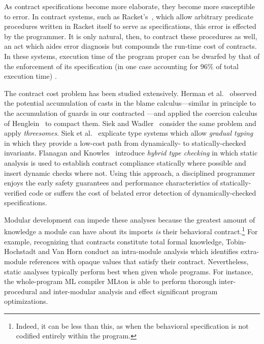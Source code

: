 \documentclass{sigplanconf}
\begin{document}
As contract specifications become more elaborate, they become more susceptible to error.
In contract systems, such as Racket's~\cite{plt-tr1}, which allow arbitrary predicate procedures written in Racket itself to serve as specifications, this error is effected by the programmer.
It is only natural, then, to contract these procedures as well, an act which aides error diagnosis but compounds the run-time cost of contracts.
In these systems, execution time of the program proper can be dwarfed by that of the enforcement of its specification (in one case accounting for 96\% of total execution time) \cite{strickland2012chaperones}.

The contract cost problem has been studied extensively.
Herman et al.~\cite{herman2010space} observed the potential accumulation of casts in the blame calculus---similar in principle to the accumulation of guards in our contracted ---and applied the coercion calculus of Henglein~\cite{henglein1994dynamic} to compact them.
Siek and Wadler~\cite{siek2010threesomes} consider the same problem and apply \emph{threesomes}.
Siek et al.~\cite{siek2006gradual} explicate type systems which allow \emph{gradual typing} in which they provide a low-cost path from dynamically- to statically-checked invariants.
Flanagan and Knowles~\cite{flanagan2006hybrid} introduce \emph{hybrid type checking} in which static analysis is used to establish contract compliance statically where possible and insert dynamic checks where not.
Using this approach, a disciplined programmer enjoys the early safety guarantees and performance characteristics of statically-verified code or suffers the cost of belated error detection of dynamically-checked specifications.

Modular development can impede these analyses because the greatest amount of knowledge a module can have about its imports \emph{is} their behavioral contract.\footnote{Indeed, it can be less than this, as when the behavioral specification is not codified entirely within the program.}
For example, recognizing that contracts constitute total formal knowledge, Tobin-Hochstadt and Van Horn \cite{tobin2012higher} conduct an intra-module analysis which identifies extra-module references with opaque values that satisfy their contract.
Nevertheless, static analyses typically perform best when given whole programs.
For instance, the whole-program ML compiler MLton \cite{weeks2006whole} is able to perform thorough inter-procedural and inter-modular analysis and effect significant program optimizations.
\end{document}

